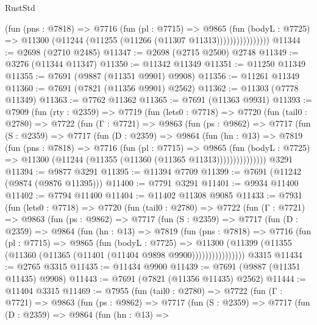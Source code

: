 \begin{lexlean}{RustStd}
\begin{coremodule}
                      (fun (pns : @7818) =>
                      @7716
                        (fun (pl : @7715) =>
                        @9865
                          (fun (bodyL : @7725) =>
                          @11300 (@11244 (@11255 (@11266 (@11307 @11313))))))))))))))))
@11344 := @2698 (@2710 @2485)
@11347 := @2698 (@2715 @2500) @2748
@11349 := @3276 (@11344 @11347)
@11350 := @11342 @11349
@11351 := @11250 @11349
@11355 := @7691 (@9887 (@11351 @9901) @9908)
@11356 := @11261 @11349
@11360 := @7691 (@7821 (@11356 @9901) @2562)
@11362 := @11303 (@7778 @11349)
@11363 := @7762 @11362
@11365 := @7691 (@11363 @9931)
@11393 := @7909
    (fun (rty : @2359) =>
    @7719
      (fun (lets0 : @7718) =>
      @7720
        (fun (tail0 : @2780) =>
        @7722
          (fun (Γ : @7721) =>
          @9863
            (fun (ps : @9862) =>
            @7717
              (fun (S : @2359) =>
              @7717
                (fun (D : @2359) =>
                @9864
                  (fun (hn : @13) =>
                  @7819
                    (fun (pns : @7818) =>
                    @7716
                      (fun (pl : @7715) =>
                      @9865
                        (fun (bodyL : @7725) =>
                        @11300 (@11244 (@11355 (@11360 (@11365 @11313)))))))))))))))
    @3291
@11394 := @9877 @3291
@11395 := @11394 @7709
@11399 := @7691 (@11242 (@9874 (@9876 @11395)))
@11400 := @7791 @3291
@11401 := @9934 @11400
@11402 := @7794 @11400
@11404 := @11402 @11308 @9085
@11433 := @7931
    (fun (lets0 : @7718) =>
    @7720
      (fun (tail0 : @2780) =>
      @7722
        (fun (Γ : @7721) =>
        @9863
          (fun (ps : @9862) =>
          @7717
            (fun (S : @2359) =>
            @7717
              (fun (D : @2359) =>
              @9864
                (fun (hn : @13) =>
                @7819
                  (fun (pns : @7818) =>
                  @7716
                    (fun (pl : @7715) =>
                    @9865
                      (fun (bodyL : @7725) =>
                      @11300
                        (@11399 (@11355 (@11360 (@11365 (@11401 (@11404 @9898 @9900))))))))))))))))
    @3315
@11434 := @2765 @3315
@11435 := @11434 @9900
@11439 := @7691 (@9887 (@11351 @11435) @9908)
@11443 := @7691 (@7821 (@11356 @11435) @2562)
@11444 := @11404 @3315
@11469 := @7955
    (fun (tail0 : @2780) =>
    @7722
      (fun (Γ : @7721) =>
      @9863
        (fun (ps : @9862) =>
        @7717
          (fun (S : @2359) =>
          @7717
            (fun (D : @2359) =>
            @9864
              (fun (hn : @13) =>

\end{coremodule}
\end{lexlean}
